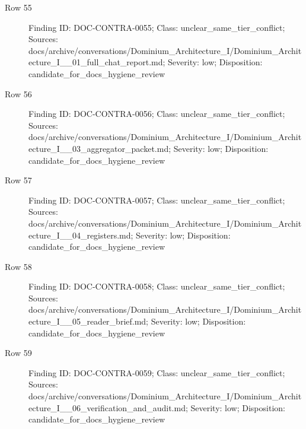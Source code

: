 \documentclass[9pt,a4paper]{book}
\begin{document}
\begin{description}
\item[Row 55] Finding ID: DOC-\allowbreak{}CONTRA-\allowbreak{}0055; Class: unclear\_\allowbreak{}same\_\allowbreak{}tier\_\allowbreak{}conflict; Sources: docs/\allowbreak{}archive/\allowbreak{}conversations/\allowbreak{}Dominium\_\allowbreak{}Architecture\_\allowbreak{}I/\allowbreak{}Dominium\_\allowbreak{}Architecture\_\allowbreak{}I\_\allowbreak{}\_\allowbreak{}01\_\allowbreak{}full\_\allowbreak{}chat\_\allowbreak{}report.\allowbreak{}md; Severity: low; Disposition: candidate\_\allowbreak{}for\_\allowbreak{}docs\_\allowbreak{}hygiene\_\allowbreak{}review
\item[Row 56] Finding ID: DOC-\allowbreak{}CONTRA-\allowbreak{}0056; Class: unclear\_\allowbreak{}same\_\allowbreak{}tier\_\allowbreak{}conflict; Sources: docs/\allowbreak{}archive/\allowbreak{}conversations/\allowbreak{}Dominium\_\allowbreak{}Architecture\_\allowbreak{}I/\allowbreak{}Dominium\_\allowbreak{}Architecture\_\allowbreak{}I\_\allowbreak{}\_\allowbreak{}03\_\allowbreak{}aggregator\_\allowbreak{}packet.\allowbreak{}md; Severity: low; Disposition: candidate\_\allowbreak{}for\_\allowbreak{}docs\_\allowbreak{}hygiene\_\allowbreak{}review
\item[Row 57] Finding ID: DOC-\allowbreak{}CONTRA-\allowbreak{}0057; Class: unclear\_\allowbreak{}same\_\allowbreak{}tier\_\allowbreak{}conflict; Sources: docs/\allowbreak{}archive/\allowbreak{}conversations/\allowbreak{}Dominium\_\allowbreak{}Architecture\_\allowbreak{}I/\allowbreak{}Dominium\_\allowbreak{}Architecture\_\allowbreak{}I\_\allowbreak{}\_\allowbreak{}04\_\allowbreak{}registers.\allowbreak{}md; Severity: low; Disposition: candidate\_\allowbreak{}for\_\allowbreak{}docs\_\allowbreak{}hygiene\_\allowbreak{}review
\item[Row 58] Finding ID: DOC-\allowbreak{}CONTRA-\allowbreak{}0058; Class: unclear\_\allowbreak{}same\_\allowbreak{}tier\_\allowbreak{}conflict; Sources: docs/\allowbreak{}archive/\allowbreak{}conversations/\allowbreak{}Dominium\_\allowbreak{}Architecture\_\allowbreak{}I/\allowbreak{}Dominium\_\allowbreak{}Architecture\_\allowbreak{}I\_\allowbreak{}\_\allowbreak{}05\_\allowbreak{}reader\_\allowbreak{}brief.\allowbreak{}md; Severity: low; Disposition: candidate\_\allowbreak{}for\_\allowbreak{}docs\_\allowbreak{}hygiene\_\allowbreak{}review
\item[Row 59] Finding ID: DOC-\allowbreak{}CONTRA-\allowbreak{}0059; Class: unclear\_\allowbreak{}same\_\allowbreak{}tier\_\allowbreak{}conflict; Sources: docs/\allowbreak{}archive/\allowbreak{}conversations/\allowbreak{}Dominium\_\allowbreak{}Architecture\_\allowbreak{}I/\allowbreak{}Dominium\_\allowbreak{}Architecture\_\allowbreak{}I\_\allowbreak{}\_\allowbreak{}06\_\allowbreak{}verification\_\allowbreak{}and\_\allowbreak{}audit.\allowbreak{}md; Severity: low; Disposition: candidate\_\allowbreak{}for\_\allowbreak{}docs\_\allowbreak{}hygiene\_\allowbreak{}review

\end{description}
\end{document}
